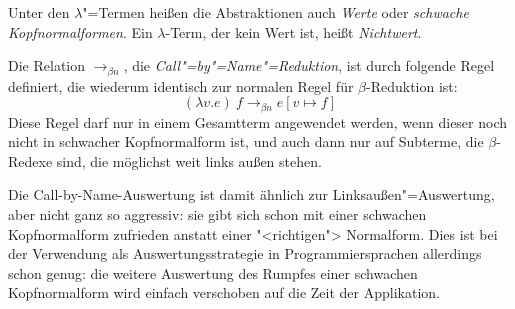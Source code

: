\begin{definition}\label{def:wert}
  Unter den $\lambda$"=Termen heißen die Abstraktionen auch
  \textit{Werte} oder \textit{schwache Kopfnormalformen}.  Ein
  $\lambda$-Term, der kein Wert ist, heißt \textit{Nichtwert}.  %
\end{definition}

\begin{definition}
  Die Relation $\rightarrow_{\beta n}$, die
  \textit{Call"=by"=Name"=Reduktion}, ist durch folgende Regel
  definiert,
  die wiederum identisch zur normalen Regel für $\beta$-Reduktion ist:
  \begin{displaymath}
    (\lambda v.e)~f \rightarrow_{\beta n} e[v\mapsto f]
  \end{displaymath}
  Diese Regel darf nur in einem Gesamtterm angewendet werden,
  wenn dieser noch nicht in schwacher Kopfnormalform ist, und auch dann
  nur auf Subterme, die $\beta$-Redexe sind, die möglichst weit
  links außen stehen.
\end{definition}
%
Die Call-by-Name-Auswertung ist damit ähnlich zur
Linksaußen"=Auswertung, aber nicht ganz so aggressiv: sie gibt sich
schon mit einer schwachen Kopfnormalform zufrieden anstatt einer
"<richtigen"> Normalform.  Dies ist bei der Verwendung als
Auswertungsstrategie in Programmiersprachen allerdings schon
genug: die weitere Auswertung des Rumpfes einer schwachen
Kopfnormalform wird einfach verschoben auf die Zeit der Applikation.

